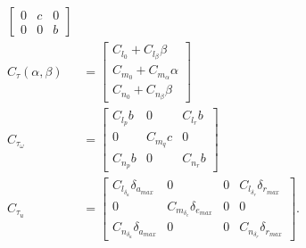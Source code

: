 \documentclass[letterpaper, 10 pt, conference]{ieeeconf}  %
\begin{document}
\begin{appendices}
\begin{align}
\begin{bmatrix}
		0 & c & 0\\
		0 & 0 & b
		\end{bmatrix}\\
		C_{\tau}\left(\alpha,\beta\right) & =\begin{bmatrix}C_{l_{0}}+C_{l_{\beta}}\beta\\
		C_{m_{0}}+C_{m_{\alpha}}\alpha\\
		C_{n_{0}}+C_{n_{\beta}}\beta
		\end{bmatrix}\\
		C_{\tau_{\omega}} & =\begin{bmatrix}C_{l_{p}}b & 0 & C_{l_{r}}b\\
		0 & C_{m_{q}}c & 0\\
		C_{n_{p}}b & 0 & C_{n_{r}}b
		\end{bmatrix}\\
		C_{\tau_{u}} & =\begin{bmatrix}C_{l_{\delta_{a}}}\delta_{a_{max}} & 0 & 0 & C_{l_{\delta_{r}}}\delta_{r_{max}}\\
		0 & C_{m_{\delta_{e}}}\delta_{e_{max}} & 0 & 0\\
		C_{n_{\delta_{a}}}\delta_{a_{max}} & 0 & 0 & C_{n_{\delta_{r}}}\delta_{r_{max}}
		\end{bmatrix}.
		\end{align}
		
	\end{appendices}
	
	
	
	
	
\end{document}
